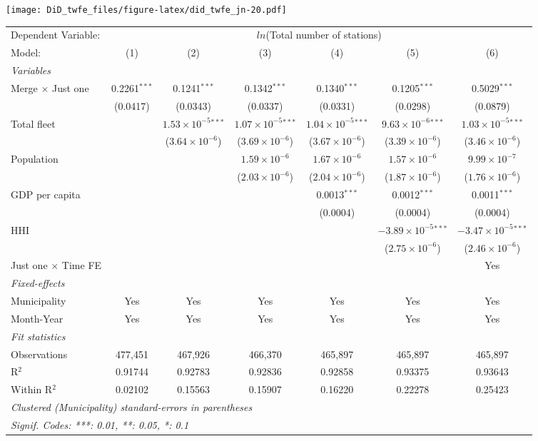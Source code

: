 \documentclass[
]{article}
\begin{document}
\texttt{[image: DiD\_twfe\_files/figure-latex/did\_twfe\_jn-20.pdf]}

\begin{tabular}{lcccccc}
\tabularnewline\midrule\midrule
Dependent Variable:&\multicolumn{6}{c}{$ln$(Total number of stations)}\\
Model:&(1) & (2) & (3) & (4) & (5) & (6)\\
\midrule \emph{Variables}&   &   &   &   &   &  \\
Merge $\times $ Just one & 0.2261$^{***}$ & 0.1241$^{***}$ & 0.1342$^{***}$ & 0.1340$^{***}$ & 0.1205$^{***}$ & 0.5029$^{***}$\\
  &(0.0417) & (0.0343) & (0.0337) & (0.0331) & (0.0298) & (0.0879)\\
Total fleet &    & $1.53\times 10^{-5}$$^{***}$ & $1.07\times 10^{-5}$$^{***}$ & $1.04\times 10^{-5}$$^{***}$ & $9.63\times 10^{-6}$$^{***}$ & $1.03\times 10^{-5}$$^{***}$\\
  &   & ($3.64\times 10^{-6}$) & ($3.69\times 10^{-6}$) & ($3.67\times 10^{-6}$) & ($3.39\times 10^{-6}$) & ($3.46\times 10^{-6}$)\\
Population &    &    & $1.59\times 10^{-6}$ & $1.67\times 10^{-6}$ & $1.57\times 10^{-6}$ & $9.99\times 10^{-7}$\\
  &   &    & ($2.03\times 10^{-6}$) & ($2.04\times 10^{-6}$) & ($1.87\times 10^{-6}$) & ($1.76\times 10^{-6}$)\\
GDP per capita &    &    &    & 0.0013$^{***}$ & 0.0012$^{***}$ & 0.0011$^{***}$\\
  &   &    &    & (0.0004) & (0.0004) & (0.0004)\\
HHI &    &    &    &    & $-3.89\times 10^{-5}$$^{***}$ & $-3.47\times 10^{-5}$$^{***}$\\
  &   &    &    &    & ($2.75\times 10^{-6}$) & ($2.46\times 10^{-6}$)\\
Just one $\times$ Time FE &  &  &  &  &  & Yes\\
\midrule \emph{Fixed-effects}&   &   &   &   &   &  \\
Municipality & Yes & Yes & Yes & Yes & Yes & Yes\\
Month-Year & Yes & Yes & Yes & Yes & Yes & Yes\\
\midrule \emph{Fit statistics}&  & & & & & \\
Observations & 477,451&467,926&466,370&465,897&465,897&465,897\\
R$^2$ & 0.91744&0.92783&0.92836&0.92858&0.93375&0.93643\\
Within R$^2$ & 0.02102&0.15563&0.15907&0.16220&0.22278&0.25423\\
\midrule\midrule\multicolumn{7}{l}{\emph{Clustered (Municipality) standard-errors in parentheses}}\\
\multicolumn{7}{l}{\emph{Signif. Codes: ***: 0.01, **: 0.05, *: 0.1}}\\
\end{tabular}
\end{document}

